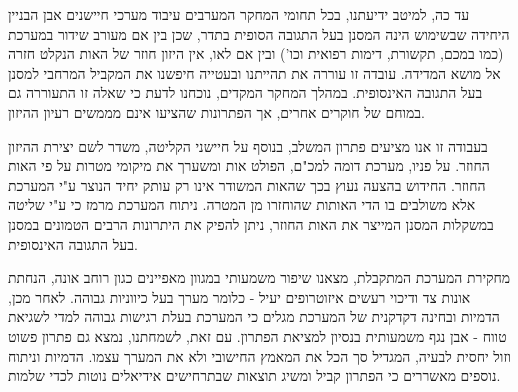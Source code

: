 \par
עד כה, למיטב ידיעתנו, בכל תחומי המחקר המערבים עיבוד מערכי חיישנים אבן הבניין היחידה שבשימוש הינה המסנן בעל התגובה הסופית בתדר, שכן בין אם מעורב שידור במערכת (כמו במכם, תקשורת, דימות רפואית וכו') ובין אם לאו, אין היזון חוזר של האות הנקלט חזרה אל מושא המדידה.
עובדה זו עוררה את תהייתנו ובעטייה חיפשנו את המקביל המרחבי למסנן בעל התגובה האינסופית.
במהלך המחקר המקדים, נוכחנו לדעת כי שאלה זו התעוררה גם במוחם של חוקרים אחרים, אך הפתרונות שהציעו אינם מממשים רעיון ההיזון.
\par
בעבודה זו אנו מציעים פתרון המשלב, בנוסף על חיישני הקליטה, משדר לשם יצירת ההיזון החוזר.
על פניו, מערכת דומה למכ"ם, הפולט אות ומשערך את מיקומי מטרות על פי האות החוזר.
החידוש בהצעה נעוץ בכך שהאות המשודר אינו רק עותק יחיד הנוצר ע"י המערכת אלא משולבים בו הדי האותות שהוחזרו מן המטרה.
ניתוח המערכת מרמז כי ע"י שליטה במשקלות המסנן המייצר את האות החוזר, ניתן להפיק את היתרונות הרבים הטמונים במסנן בעל התגובה האינסופית.
\par
מחקירת המערכת המתקבלת, מצאנו שיפור משמעותי במגוון מאפיינים כגון רוחב אונה, הנחתת אונות צד ודיכוי רעשים איזוטרופים יעיל - כלומר מערך בעל כיווניות גבוהה.
לאחר מכן, הדמיות ובחינה דקדקנית של המערכת מגלים כי המערכת בעלת רגישות גבוהה למדי לשגיאת טווח - אבן נגף משמעותית בנסיון למציאת הפתרון.
עם זאת, לשמחתנו, נמצא גם פתרון פשוט וזול יחסית לבעיה, המגדיל סך הכל את המאמץ החישובי ולא את המערך עצמו.
הדמיות וניתוח נוספים מאשררים כי הפתרון קביל ומשיג תוצאות שבתרחישים אידיאלים נוטות לכדי שלמות.

